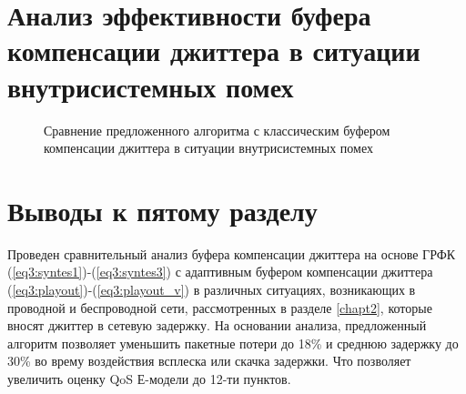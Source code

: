 \section{Анализ эффективности буфера компенсации джиттера в ситуации внутрисистемных помех} \label{sect4}

\pgfplotsset{width=15cm, height=10cm, compat=1.3}
\begin{figure} [h]
  \center
{}
\caption{Сравнение предложенного алгоритма с классическим буфером компенсации джиттера в ситуации внутрисистемных помех}
  \label{img4:distBuff}
\end{figure}


\section{Выводы к пятому разделу} \label{sect:concl4}
Проведен сравнительный анализ буфера компенсации джиттера на основе ГРФК (\ref{eq3:syntes1})-(\ref{eq3:syntes3})
с адаптивным буфером компенсации джиттера (\ref{eq3:playout})-(\ref{eq3:playout_v}) в различных ситуациях, возникающих в проводной и беспроводной сети, рассмотренных в разделе \ref{chapt2}, которые вносят джиттер в сетевую задержку.
На основании анализа, предложенный алгоритм позволяет уменьшить пакетные потери до 18\% и среднюю задержку до 30\% во врему воздействия всплеска или скачка задержки.
Что позволяет увеличить оценку QoS Е-модели до 12-ти пунктов.